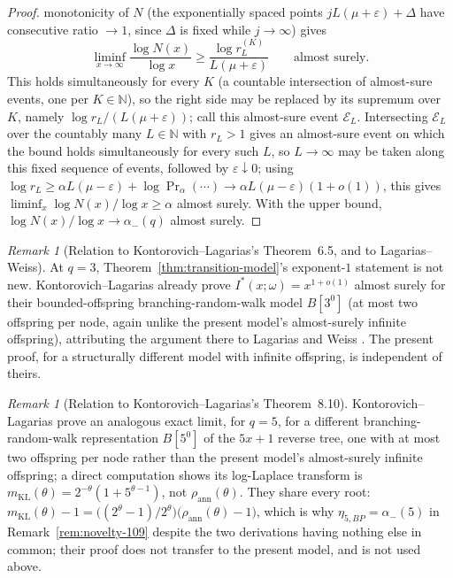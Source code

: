 \documentclass[11pt]{article}
\theoremstyle{remark}
\newtheorem{remark}[theorem]{Remark}
\begin{document}
\begin{proof}
monotonicity of $N$ (the exponentially spaced points
$jL(\mu+\varepsilon)+\Delta$ have consecutive ratio $\to1$, since
$\Delta$ is fixed while $j\to\infty$) gives
\[
 \liminf_{x\to\infty}\frac{\log N(x)}{\log x}
 \ge\frac{\log r_L^{(K)}}{L(\mu+\varepsilon)}\qquad\text{almost surely.}
\]
This holds simultaneously for every $K$ (a countable intersection of
almost-sure events, one per $K\in\mathbb N$), so the right side may be
replaced by its supremum over $K$, namely $\log r_L/(L(\mu+\varepsilon))$;
call this almost-sure event $\mathcal E_L$. Intersecting
$\mathcal E_L$ over the countably many $L\in\mathbb N$ with $r_L>1$
gives an almost-sure event on which the bound holds simultaneously for
every such $L$, so $L\to\infty$ may be taken along this fixed sequence
of events, followed by $\varepsilon\downarrow0$; using
$\log r_L\ge\alpha L(\mu-\varepsilon)+\log\Pr_\alpha(\cdots)\to\alpha
L(\mu-\varepsilon)(1+o(1))$, this gives
$\liminf_x\log N(x)/\log x\ge\alpha$ almost surely. With the upper
bound, $\log N(x)/\log x\to\alpha_-(q)$ almost surely.
\end{proof}

\begin{remark}[Relation to Kontorovich--Lagarias's Theorem~6.5, and to Lagarias--Weiss]
At $q=3$, Theorem~\ref{thm:transition-model}'s exponent-$1$ statement
is not new. Kontorovich--Lagarias \cite[Theorem~6.5]{KontorovichLagarias2010}
already prove $I^\ast(x;\omega)=x^{1+o(1)}$ almost surely for their
bounded-offspring branching-random-walk model $B[3^0]$ (at most two
offspring per node, again unlike the present model's almost-surely
infinite offspring), attributing the argument there to Lagarias and
Weiss \cite[Theorem~4.2]{LagariasWeiss1992}. The present proof, for a
structurally different model with infinite offspring, is independent
of theirs.
\end{remark}

\begin{remark}[Relation to Kontorovich--Lagarias's Theorem~8.10]
Kontorovich--Lagarias \cite[Theorem~8.10]{KontorovichLagarias2010}
prove an analogous exact limit, for $q=5$, for a different
branching-random-walk representation $B[5^0]$ of the $5x+1$ reverse
tree, one with at most two offspring per node rather than the present
model's almost-surely infinite offspring; a direct computation shows
its log-Laplace transform is $m_{\mathrm{KL}}(\theta)=
2^{-\theta}(1+5^{\theta-1})$, not $\rho_{\mathrm{ann}}(\theta)$. They
share every root: $m_{\mathrm{KL}}(\theta)-1=\bigl((2^\theta-1)/2^\theta\bigr)
\bigl(\rho_{\mathrm{ann}}(\theta)-1\bigr)$, which is why
$\eta_{5,BP}=\alpha_-(5)$ in Remark~\ref{rem:novelty-109} despite the
two derivations having nothing else in common; their proof does not
transfer to the present model, and is not used above.
\end{remark}
\end{document}
